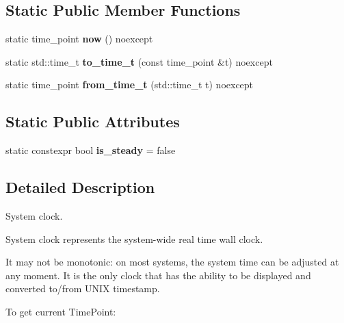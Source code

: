 \subsection*{Static Public Member Functions}
\begin{DoxyCompactItemize}
\item 
static time\+\_\+point {\bfseries now} () noexcept\hypertarget{classndn_1_1time_1_1system__clock_a26d280f8217a97cd6b0adcf97a3110d9}{}\label{classndn_1_1time_1_1system__clock_a26d280f8217a97cd6b0adcf97a3110d9}

\item 
static std\+::time\+\_\+t {\bfseries to\+\_\+time\+\_\+t} (const time\+\_\+point \&t) noexcept\hypertarget{classndn_1_1time_1_1system__clock_a6762a357c9c84174010c4a07e5238e2e}{}\label{classndn_1_1time_1_1system__clock_a6762a357c9c84174010c4a07e5238e2e}

\item 
static time\+\_\+point {\bfseries from\+\_\+time\+\_\+t} (std\+::time\+\_\+t t) noexcept\hypertarget{classndn_1_1time_1_1system__clock_ae015e57a551a51bcd216fc573489d7be}{}\label{classndn_1_1time_1_1system__clock_ae015e57a551a51bcd216fc573489d7be}

\end{DoxyCompactItemize}
\subsection*{Static Public Attributes}
\begin{DoxyCompactItemize}
\item 
static constexpr bool {\bfseries is\+\_\+steady} = false\hypertarget{classndn_1_1time_1_1system__clock_ad4393056f72433a158459e5fb8c7c5f0}{}\label{classndn_1_1time_1_1system__clock_ad4393056f72433a158459e5fb8c7c5f0}

\end{DoxyCompactItemize}


\subsection{Detailed Description}
System clock. 

System clock represents the system-\/wide real time wall clock.

It may not be monotonic\+: on most systems, the system time can be adjusted at any moment. It is the only clock that has the ability to be displayed and converted to/from U\+N\+IX timestamp.

To get current Time\+Point\+:

